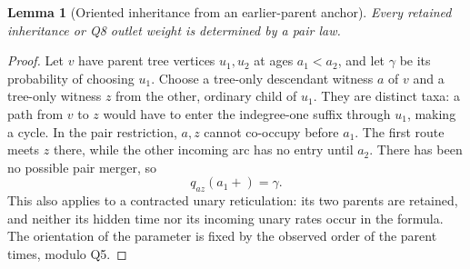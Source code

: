 \documentclass[11pt]{article}
\newtheorem{lemma}[theorem]{Lemma}
\begin{document}
\begin{lemma}[Oriented inheritance from an earlier-parent anchor]
\label{lem:oriented-inheritance}
Every retained inheritance or Q8 outlet weight is determined by a pair law.
\end{lemma}
\begin{proof}
Let $v$ have parent tree vertices $u_1,u_2$ at ages $a_1<a_2$, and let
$\gamma$ be its probability of choosing $u_1$.  Choose a tree-only
descendant witness $a$ of $v$ and a tree-only witness $z$ from the other,
ordinary child of $u_1$.  They are distinct taxa: a path from $v$ to $z$
would have to enter the indegree-one suffix through $u_1$, making a cycle.
In the pair restriction, $a,z$ cannot co-occupy before $a_1$.  The first
route meets $z$ there, while the other incoming arc has no entry until
$a_2$.  There has been no possible pair merger, so
\[
 q_{az}(a_1+)=\gamma.
\]
This also applies to a contracted unary reticulation: its two parents are
retained, and neither its hidden time nor its incoming unary rates occur
in the formula.  The orientation of the parameter is fixed by the observed
order of the parent times, modulo Q5.
\end{proof}
\end{document}
